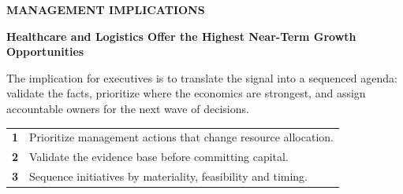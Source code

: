\documentclass[10pt,a4paper]{article}
\begin{document}
\clearpage
{\textcolor{BOBlue}{\scriptsize\bfseries MANAGEMENT IMPLICATIONS}}\par\vspace{-1pt}
{\Large\sffamily\bfseries\color{BONavy} Healthcare and Logistics Offer the Highest Near-Term Growth Opportunities}\par\vspace{4pt}
{\small The implication for executives is to translate the signal into a sequenced agenda: validate the facts, prioritize where the economics are strongest, and assign accountable owners for the next wave of decisions.}\par
\begin{tabularx}{\linewidth}{p{10mm}Y}
\textcolor{BOBlue}{\bfseries 1} & Prioritize management actions that change resource allocation. \\[5pt]
\textcolor{BOBlue}{\bfseries 2} & Validate the evidence base before committing capital. \\[5pt]
\textcolor{BOBlue}{\bfseries 3} & Sequence initiatives by materiality, feasibility and timing. \\[5pt]
\end{tabularx}
\vspace{6pt}

\vspace{6pt}{\textcolor{BOBlue}{\scriptsize\bfseries EXECUTION ROADMAP}}\par
\begin{center}
\end{center}
\end{document}
